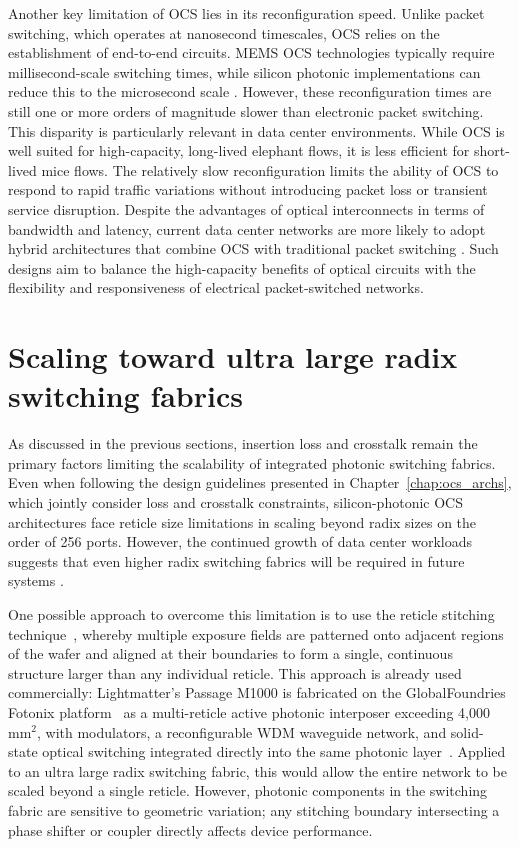 Another key limitation of OCS lies in its reconfiguration speed.
Unlike packet switching, which operates at nanosecond timescales, OCS relies on the establishment of end-to-end circuits.
MEMS OCS technologies typically require millisecond-scale switching times, while silicon photonic implementations can reduce this to the microsecond scale \cite{CignalAI2025OCS4Q25}.
However, these reconfiguration times are still one or more orders of magnitude slower than electronic packet switching.
This disparity is particularly relevant in data center environments.
While OCS is well suited for high-capacity, long-lived elephant flows, it is less efficient for short-lived mice flows.
The relatively slow reconfiguration limits the ability of OCS to respond to rapid traffic variations without introducing packet loss or transient service disruption.
Despite the advantages of optical interconnects in terms of bandwidth and latency, current data center networks are more likely to adopt hybrid architectures that combine OCS with traditional packet switching \cite{liaoMixNetRuntimeReconfigurable2025}.
Such designs aim to balance the high-capacity benefits of optical circuits with the flexibility and responsiveness of electrical packet-switched networks.

\section{Scaling toward ultra large radix switching fabrics} \label{subsec:multi_chip}
As discussed in the previous sections, insertion loss and crosstalk remain the primary factors limiting the scalability of integrated photonic switching fabrics.
Even when following the design guidelines presented in Chapter~\ref{chap:ocs_archs}, which jointly consider loss and crosstalk constraints, silicon-photonic OCS architectures face reticle size limitations in scaling beyond radix sizes on the order of 256 ports.
However, the continued growth of data center workloads suggests that even higher radix switching fabrics will be required in future systems \cite{song2025survey}.

One possible approach to overcome this limitation is to use the reticle stitching technique~\cite{reticle_stitching}, whereby multiple exposure fields are patterned onto adjacent regions of the wafer and aligned at their boundaries to form a single, continuous structure larger than any individual reticle.
This approach is already used commercially: Lightmatter's Passage M1000 is fabricated on the GlobalFoundries Fotonix platform~\cite{gf_silicon_photonics} as a multi-reticle active photonic interposer exceeding 4,000\,mm$^2$, with modulators, a reconfigurable WDM waveguide network, and solid-state optical switching integrated directly into the same photonic layer~\cite{tspa2025passage}.
Applied to an ultra large radix switching fabric, this would allow the entire network to be scaled beyond a single reticle.
However, photonic components in the switching fabric are sensitive to geometric variation; any stitching boundary intersecting a phase shifter or coupler directly affects device performance.

